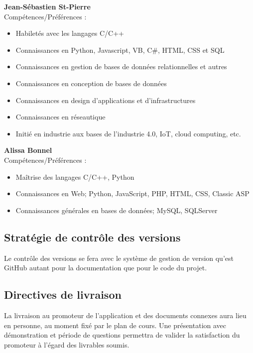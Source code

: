\documentclass[12pt]{article}
\begin{document}
\noindent \textbf{Jean-Sébastien St-Pierre} \\
Compétences/Préférences :
\begin{itemize}
    \item Habiletés avec les langages C/C++
    \item Connaissances en Python, Javascript, VB, C\#, HTML, CSS et SQL
    \item Connaissances en  gestion de bases de données relationnelles et autres
    \item Connaissances en conception de bases de données
    \item Connaissances en design d'applications et d'infrastructures
    \item Connaissances en réseautique
    \item Initié en industrie aux bases de l’industrie 4.0, IoT, cloud
    computing, etc. \\
\end{itemize}

\noindent \textbf{Alissa Bonnel} \\
Compétences/Préférences :
\begin{itemize}
    \item Maîtrise des langages C/C++, Python
    \item Connaissances en Web; Python, JavaScript, PHP, HTML, CSS, Classic ASP
    \item Connaissances générales en bases de données; MySQL, SQLServer
\end{itemize}

\subsection{Stratégie de contrôle des versions}

Le contrôle des versions se fera avec le système de gestion de version qu'est GitHub autant
pour la documentation que pour le code du projet.

\subsection{Directives de livraison}
La livraison au promoteur de l'application et des documents connexes aura lieu en personne, au moment fixé par le plan de cours.  Une présentation avec démonstration et période de questions permettra de valider la satisfaction du promoteur à l'égard des livrables soumis.

\newpage
\end{document}
